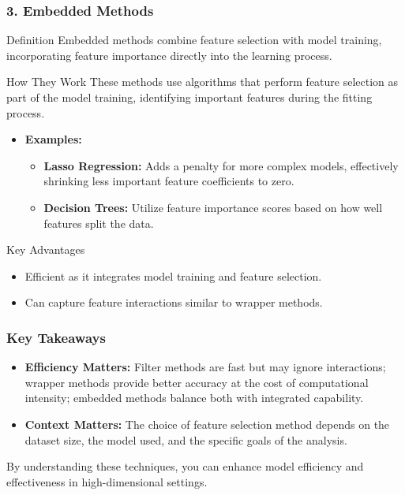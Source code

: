 \documentclass{beamer}
\begin{document}
\begin{frame}[fragile]
    \frametitle{3. Embedded Methods}
    \begin{block}{Definition}
        Embedded methods combine feature selection with model training, incorporating feature importance directly into the learning process.
    \end{block}

    \begin{block}{How They Work}
        These methods use algorithms that perform feature selection as part of the model training, identifying important features during the fitting process.
    \end{block}

    \begin{itemize}
        \item \textbf{Examples:}
        \begin{itemize}
            \item \textbf{Lasso Regression:} Adds a penalty for more complex models, effectively shrinking less important feature coefficients to zero.
            \item \textbf{Decision Trees:} Utilize feature importance scores based on how well features split the data.
        \end{itemize}
    \end{itemize}

    \begin{block}{Key Advantages}
        \begin{itemize}
            \item Efficient as it integrates model training and feature selection.
            \item Can capture feature interactions similar to wrapper methods.
        \end{itemize}
    \end{block}
\end{frame}

\begin{frame}[fragile]
    \frametitle{Key Takeaways}
    \begin{itemize}
        \item \textbf{Efficiency Matters:} 
        Filter methods are fast but may ignore interactions; wrapper methods provide better accuracy at the cost of computational intensity; embedded methods balance both with integrated capability.
        
        \item \textbf{Context Matters:} 
        The choice of feature selection method depends on the dataset size, the model used, and the specific goals of the analysis.
    \end{itemize}
    
    By understanding these techniques, you can enhance model efficiency and effectiveness in high-dimensional settings.
\end{frame}
\end{document}
